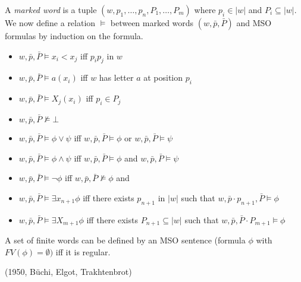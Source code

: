 \begin{definition}[Semantics]
	A \emph{marked word} is a tuple $(w, p_{1}, \ldots, p_{n}, P_{1}, \ldots,
	P_{m})$ where $p_{i} \in |w|$ and $P_{i} \subseteq |w|$.
	We now define a relation $\models$ between marked words $(w,\bar{p}, \bar{P})$ 
	and MSO formulas by induction on the formula.

	\begin{itemize}
		\item $w, \bar{p}, \bar{P} \models x_{i} < x_{j}$ iff $p_{i} p_{j}$ in $w$ 
		\item $w, \bar{p}, \bar{P} \models a(x_{i})$ iff $w$ has letter $a$ 
			at position $p_{i}$ 
		\item $w, \bar{p}, \bar{P} \models X_{j}(x_{i})$ iff $p_{i} \in P_{j}$ 
		\item $w, \bar{p}, \bar{P} \not\models \bot$
		\item $w, \bar{p}, \bar{P} \models \phi \lor \psi$ iff 
			$w ,\bar{p}, \bar{P} \models \phi$ or
			$w ,\bar{p}, \bar{P} \models \psi$
		\item $w, \bar{p}, \bar{P} \models \phi \land \psi$ iff 
			$w ,\bar{p}, \bar{P} \models \phi$ and
			$w ,\bar{p}, \bar{P} \models \psi$
		\item $w, \bar{p}, \bar{P} \models \neg\phi $ iff 
			$w ,\bar{p}, \bar{P} \not\models \phi$ and
		\item $w, \bar{p}, \bar{P} \models \exists x_{n+1}\phi $ iff 
			there exists $p_{n+1}$ in $|w|$ such that 
			$w, \bar{p}\cdot p_{n+1}, \bar{P} \models \phi$
		\item $w, \bar{p}, \bar{P} \models \exists X_{m+1}\phi $ iff 
			there exists $P_{n+1} \subseteq |w|$ such that 
			$w, \bar{p}, \bar{P}\cdot P_{m+1} \models \phi$
	\end{itemize}
\end{definition}
\begin{theorem} 
	A set of finite words can be defined by an MSO sentence (formula $\phi$ 
	with $FV(\phi) = \emptyset)$ iff it is regular.
	\begin{flushright}
		(1950, Büchi, Elgot, Trakhtenbrot)
	\end{flushright}
\end{theorem}
